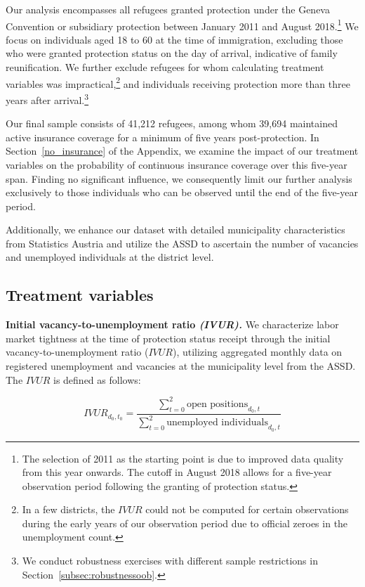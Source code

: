 Our analysis encompasses all refugees granted protection under the Geneva Convention or subsidiary protection between January 2011 and August 2018.\footnote{The selection of 2011 as the starting point is due to improved data quality from this year onwards. The cutoff in August 2018 allows for a five-year observation period following the granting of protection status.} We focus on individuals aged 18 to 60 at the time of immigration, excluding those who were granted protection status on the day of arrival, indicative of family reunification. We further exclude refugees for whom calculating treatment variables was impractical,\footnote{In a few districts, the $IVUR$ could not be computed for certain observations during the early years of our observation period due to official zeroes in the unemployment count.} and individuals receiving protection more than three years after arrival.\footnote{We conduct robustness exercises with different sample restrictions in Section~\ref{subsec:robustnessoob}.}

Our final sample consists of 41,212 refugees, among whom 39,694 maintained active insurance coverage for a minimum of five years post-protection. In Section~\ref{no_insurance} of the Appendix, we examine the impact of our treatment variables on the probability of continuous insurance coverage over this five-year span. Finding no significant influence, we consequently limit our further analysis exclusively to those individuals who can be observed until the end of the five-year period.

Additionally, we enhance our dataset with detailed municipality characteristics from Statistics Austria and utilize the ASSD to ascertain the number of vacancies and unemployed individuals at the district level.


\subsection{Treatment variables}

\vspace{0.3cm}
\textbf{Initial vacancy-to-unemployment ratio \textit{(IVUR).}} \hspace{0.5cm} We characterize labor market tightness at the time of protection status receipt through the initial vacancy-to-unemployment ratio ($IVUR$), utilizing aggregated monthly data on registered unemployment and vacancies at the municipality level from the ASSD. The $IVUR$ is defined as follows:

\begin{equation}
\label{eq:IVUR}
IVUR_{d_0,t_0} = \frac{\sum_{t=0}^{2} \text{open positions}_{d_0, t}}{\sum_{t=0}^{2}\text{unemployed individuals}_{d_0, t}}
\end{equation}

